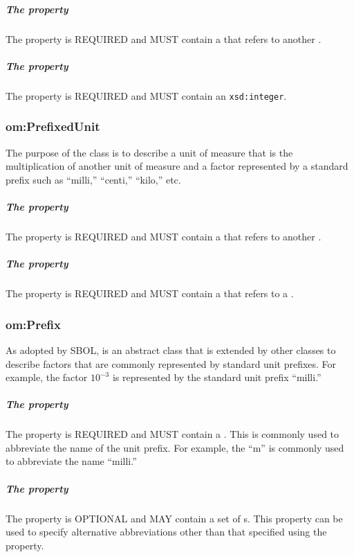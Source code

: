 \subparagraph{The  property}\label{sec:om:hasBase}
The  property is REQUIRED and MUST contain a  that refers to another .

\subparagraph{The  property}\label{sec:om:hasExponent}
The  property is REQUIRED and MUST contain an \texttt{xsd:integer}.

\subsubsection{om:PrefixedUnit}
\label{sec:om:PrefixedUnit}

The purpose of the  class is to describe a unit of measure that is the multiplication of another unit of measure and a factor represented by a standard prefix such as ``milli,'' ``centi,'' ``kilo,'' etc.

\subparagraph{The  property}\label{sec:om:hasUnit:PrefixedUnit}
The  property is REQUIRED and MUST contain a  that refers to another .

\subparagraph{The  property}\label{sec:om:hasPrefix}
The  property is REQUIRED and MUST contain a  that refers to a .

\subsubsection{om:Prefix}
\label{sec:om:Prefix}

As adopted by SBOL,  is an abstract class that is extended by other classes to describe factors that are commonly represented by standard unit prefixes. For example, the factor $10^{-3}$ is represented by the standard unit prefix ``milli.''

\subparagraph{The  property}\label{sec:om:symbol:Prefix}
The  property is REQUIRED and MUST contain a . This  is commonly used to abbreviate the name of the unit prefix. For example, the  ``m'' is commonly used to abbreviate the name ``milli.''

\subparagraph{The  property}\label{sec:om:alternativeSymbols:Prefix}
The  property is OPTIONAL and MAY contain a set of s. This property can be used to specify alternative abbreviations other than that specified using the  property.

